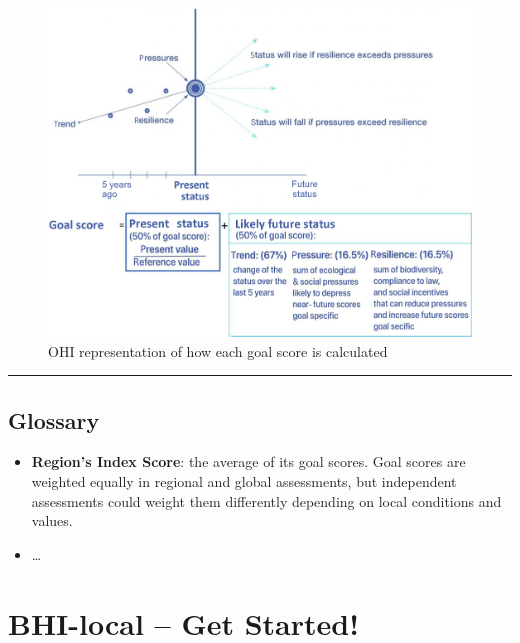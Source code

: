 \documentclass[
]{book}
\providecommand{\tightlist}{%
  \setlength{\itemsep}{0pt}\setlength{\parskip}{0pt}}
\begin{document}
\begin{figure}

{\centering \includegraphics[width=800px]{_book/_main_files/figure-html/ohi-dimensions} 

}

\caption{OHI representation of how each goal score is calculated}\label{fig:unnamed-chunk-6}
\end{figure}

\begin{center}\rule{0.5\linewidth}{0.5pt}\end{center}

\hypertarget{glossary}{%
\section*{Glossary}\label{glossary}}

\begin{itemize}
\tightlist
\item
  \textbf{Region's Index Score}: the average of its goal scores. Goal scores are weighted equally in regional and global assessments, but independent assessments could weight them differently depending on local conditions and values.
\item
  \ldots{}
\end{itemize}

\hypertarget{bhi-local-get-started}{%
\chapter{BHI-local -- Get Started!}\label{bhi-local-get-started}}
\end{document}
